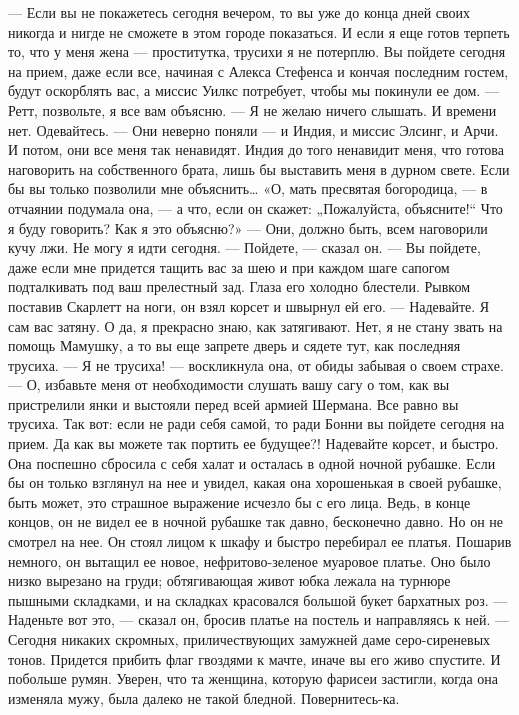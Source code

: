 — Если вы не покажетесь сегодня вечером, то вы уже до конца дней своих никогда и нигде не сможете в этом городе показаться. И если я еще готов терпеть то, что у меня жена — проститутка, трусихи я не потерплю. Вы пойдете сегодня на прием, даже если все, начиная с Алекса Стефенса и кончая последним гостем, будут оскорблять вас, а миссис Уилкс потребует, чтобы мы покинули ее дом.
— Ретт, позвольте, я все вам объясню.
— Я не желаю ничего слышать. И времени нет. Одевайтесь.
— Они неверно поняли — и Индия, и миссис Элсинг, и Арчи. И потом, они все меня так ненавидят. Индия до того ненавидит меня, что готова наговорить на собственного брата, лишь бы выставить меня в дурном свете. Если бы вы только позволили мне объяснить…
«О, мать пресвятая богородица, — в отчаянии подумала она, — а что, если он скажет: „Пожалуйста, объясните!“ Что я буду говорить? Как я это объясню?» — Они, должно быть, всем наговорили кучу лжи. Не могу я идти сегодня.
— Пойдете, — сказал он. — Вы пойдете, даже если мне придется тащить вас за шею и при каждом шаге сапогом подталкивать под ваш прелестный зад.
Глаза его холодно блестели. Рывком поставив Скарлетт на ноги, он взял корсет и швырнул ей его.
— Надевайте. Я сам вас затяну. О да, я прекрасно знаю, как затягивают. Нет, я не стану звать на помощь Мамушку, а то вы еще запрете дверь и сядете тут, как последняя трусиха.
— Я не трусиха! — воскликнула она, от обиды забывая о своем страхе.
— О, избавьте меня от необходимости слушать вашу сагу о том, как вы пристрелили янки и выстояли перед всей армией Шермана. Все равно вы трусиха. Так вот: если не ради себя самой, то ради Бонни вы пойдете сегодня на прием. Да как вы можете так портить ее будущее?! Надевайте корсет, и быстро.
Она поспешно сбросила с себя халат и осталась в одной ночной рубашке. Если бы он только взглянул на нее и увидел, какая она хорошенькая в своей рубашке, быть может, это страшное выражение исчезло бы с его лица. Ведь, в конце концов, он не видел ее в ночной рубашке так давно, бесконечно давно. Но он не смотрел на нее. Он стоял лицом к шкафу и быстро перебирал ее платья. Пошарив немного, он вытащил ее новое, нефритово-зеленое муаровое платье. Оно было низко вырезано на груди; обтягивающая живот юбка лежала на турнюре пышными складками, и на складках красовался большой букет бархатных роз.
— Наденьте вот это, — сказал он, бросив платье на постель и направляясь к ней. — Сегодня никаких скромных, приличествующих замужней даме серо-сиреневых тонов. Придется прибить флаг гвоздями к мачте, иначе вы его живо спустите. И побольше румян. Уверен, что та женщина, которую фарисеи застигли, когда она изменяла мужу, была далеко не такой бледной. Повернитесь-ка.
